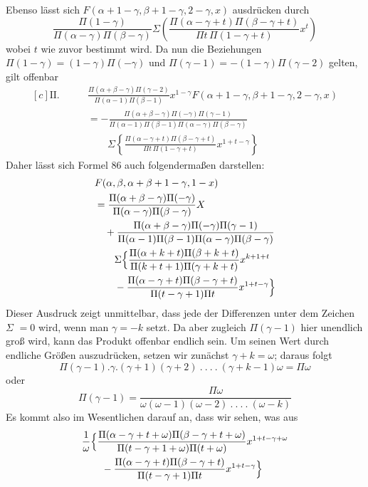 Ebenso lässt sich $F(\alpha+1-\gamma,\beta+1-\gamma,2-\gamma,x)$ ausdrücken durch
\[
\frac{\Pi(1-\gamma)}{\Pi(\alpha-\gamma)\Pi(\beta-\gamma)}
\Sigma\left(\frac{\Pi(\alpha-\gamma+t)\Pi(\beta-\gamma+t)}{\Pi t\,\Pi(1-\gamma+t)}x^t\right)
\]
wobei $t$ wie zuvor bestimmt wird. Da nun die Beziehungen $\Pi(1-\gamma)=(1-\gamma)\Pi(-\gamma)$ und $\Pi(\gamma-1)=-(1-\gamma)\Pi(\gamma-2)$ gelten, gilt offenbar
\[
\begin{aligned}[c]
\mathrm{II.}\qquad&\frac{\Pi(\alpha+\beta-\gamma)\Pi(\gamma-2)}{\Pi(\alpha-1)\Pi(\beta-1)}x^{1-\gamma}F(\alpha+1-\gamma,\beta+1-\gamma,2-\gamma,x)\\
&=-\frac{\Pi(\alpha+\beta-\gamma)\Pi(-\gamma)\Pi(\gamma-1)}{\Pi(\alpha-1)\Pi(\beta-1)\Pi(\alpha-\gamma)\Pi(\beta-\gamma)}
\\&\qquad\Sigma\left\{\frac{\Pi(\alpha-\gamma+t)\Pi(\beta-\gamma+t)}{\Pi t\,\Pi(1-\gamma+t)}x^{1+t-\gamma}\right\}
\end{aligned}
\]
Daher lässt sich Formel 86 auch folgendermaßen darstellen:
\[
\begin{aligned}[c]
&F(\alpha,\beta,\alpha+\beta+1-\gamma,1-x)\\
&=\frac{\Pi(\alpha+\beta-\gamma)\Pi(-\gamma)}{\Pi(\alpha-\gamma)\Pi(\beta-\gamma)}X\\
&\quad+\frac{\Pi(\alpha+\beta-\gamma)\Pi(-\gamma)\Pi(\gamma-1)}{\Pi(\alpha-1)\Pi(\beta-1)\Pi(\alpha-\gamma)\Pi(\beta-\gamma)}
\\&\qquad\Sigma\Bigl\{\frac{\Pi(\alpha+k+t)\Pi(\beta+k+t)}{\Pi(k+t+1)\Pi(\gamma+k+t)}x^{k+1+t}
\\&\qquad-\frac{\Pi(\alpha-\gamma+t)\Pi(\beta-\gamma+t)}{\Pi(t-\gamma+1)\Pi t}x^{1+t-\gamma}\Bigr\}
\end{aligned}
\]
Dieser Ausdruck zeigt unmittelbar, dass jede der Differenzen unter dem Zeichen $\Sigma$ $=0$ wird, wenn man $\gamma=-k$ setzt. Da aber zugleich $\Pi(\gamma-1)$ hier unendlich groß wird, kann das Produkt offenbar endlich sein. Um seinen Wert durch endliche Größen auszudrücken, setzen wir zunächst $\gamma+k=\omega$; daraus folgt
\[
\Pi(\gamma-1).\gamma.(\gamma+1)(\gamma+2)\ .\ .\ .\ .\ (\gamma+k-1)\omega=\Pi\omega
\]
oder
\[
\Pi(\gamma-1)=\frac{\Pi\omega}{\omega(\omega-1)(\omega-2)\ .\ .\ .\ .\ (\omega-k)}
\]
Es kommt also im Wesentlichen darauf an, dass wir sehen, was aus
\[
\begin{aligned}&\frac{1}{\omega}\Bigl\{\frac{\Pi(\alpha-\gamma+t+\omega)\Pi(\beta-\gamma+t+\omega)}{\Pi(t-\gamma+1+\omega)\Pi(t+\omega)}x^{1+t-\gamma+\omega}\\&\qquad-\frac{\Pi(\alpha-\gamma+t)\Pi(\beta-\gamma+t)}{\Pi(t-\gamma+1)\Pi t}x^{1+t-\gamma}\Bigr\}\end{aligned}
\]
